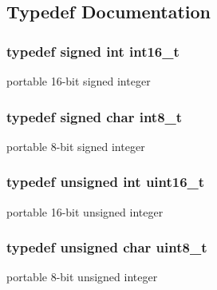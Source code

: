 \subsection{Typedef Documentation}
\hypertarget{group___d_o_g_m128__common_ga932e6ccc3d54c58f761c1aead83bd6d7}{
\subsubsection[{int16\-\_\-t}]{\setlength{\rightskip}{0pt plus 5cm}typedef signed int {\bf int16\-\_\-t}}}\label{group___d_o_g_m128__common_ga932e6ccc3d54c58f761c1aead83bd6d7}
portable 16-\/bit signed integer \hypertarget{group___d_o_g_m128__common_gaef44329758059c91c76d334e8fc09700}{
\subsubsection[{int8\-\_\-t}]{\setlength{\rightskip}{0pt plus 5cm}typedef signed char {\bf int8\-\_\-t}}}\label{group___d_o_g_m128__common_gaef44329758059c91c76d334e8fc09700}
portable 8-\/bit signed integer \hypertarget{group___d_o_g_m128__common_ga1f1825b69244eb3ad2c7165ddc99c956}{
\subsubsection[{uint16\-\_\-t}]{\setlength{\rightskip}{0pt plus 5cm}typedef unsigned int {\bf uint16\-\_\-t}}}\label{group___d_o_g_m128__common_ga1f1825b69244eb3ad2c7165ddc99c956}
portable 16-\/bit unsigned integer \hypertarget{group___d_o_g_m128__common_gaba7bc1797add20fe3efdf37ced1182c5}{
\subsubsection[{uint8\-\_\-t}]{\setlength{\rightskip}{0pt plus 5cm}typedef unsigned char {\bf uint8\-\_\-t}}}\label{group___d_o_g_m128__common_gaba7bc1797add20fe3efdf37ced1182c5}
portable 8-\/bit unsigned integer 

